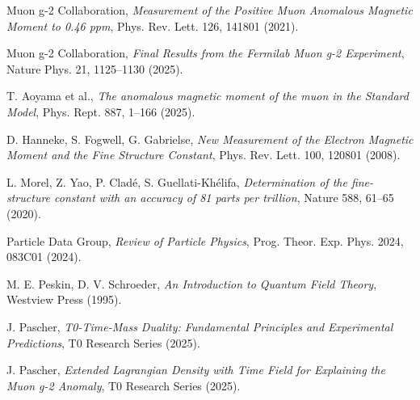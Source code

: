 \documentclass[12pt,a4paper]{article}
\begin{document}
	\begin{thebibliography}{9}
		Muon g-2 Collaboration, 
		\textit{Measurement of the Positive Muon Anomalous Magnetic Moment to 0.46 ppm},
		Phys. Rev. Lett. 126, 141801 (2021).
		
		Muon g-2 Collaboration,
		\textit{Final Results from the Fermilab Muon g-2 Experiment},
		Nature Phys. 21, 1125–1130 (2025).
		
		T. Aoyama et al.,
		\textit{The anomalous magnetic moment of the muon in the Standard Model},
		Phys. Rept. 887, 1–166 (2025).
		
		D. Hanneke, S. Fogwell, G. Gabrielse,
		\textit{New Measurement of the Electron Magnetic Moment and the Fine Structure Constant},
		Phys. Rev. Lett. 100, 120801 (2008).
		
		L. Morel, Z. Yao, P. Cladé, S. Guellati-Khélifa,
		\textit{Determination of the fine-structure constant with an accuracy of 81 parts per trillion},
		Nature 588, 61–65 (2020).
		
		Particle Data Group,
		\textit{Review of Particle Physics},
		Prog. Theor. Exp. Phys. 2024, 083C01 (2024).
		
		M. E. Peskin, D. V. Schroeder,
		\textit{An Introduction to Quantum Field Theory},
		Westview Press (1995).
		
		J. Pascher,
		\textit{T0-Time-Mass Duality: Fundamental Principles and Experimental Predictions},
		T0 Research Series (2025).
		
		J. Pascher,
		\textit{Extended Lagrangian Density with Time Field for Explaining the Muon g-2 Anomaly},
		T0 Research Series (2025).
	\end{thebibliography}
	
\end{document}
